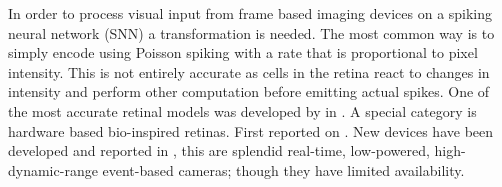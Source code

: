 In order to process visual input from frame based imaging devices on a spiking 
neural network (SNN) a transformation is needed. The most common way is to 
simply encode using Poisson spiking with a rate that is proportional to pixel
intensity. This is not entirely accurate as cells in the retina react to changes
in intensity\cite{webvision} and perform other computation before emitting 
actual spikes. One of the most accurate retinal models was
developed by \citeauthor{virtual-retina} in \cite{virtual-retina}. A special
category is hardware based bio-inspired retinas. First reported on 
\cite{carver-mead}. New devices have been developed and reported in
\cite{aer-retina-bernabe, dvs-zurich}, this are splendid real-time, low-powered,
high-dynamic-range event-based cameras; though they have limited availability.


